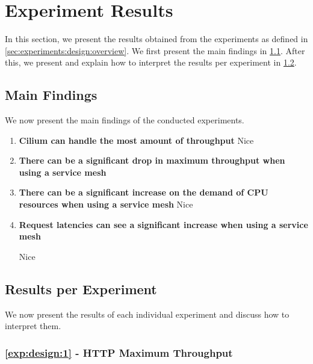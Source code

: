 \section{Experiment Results}
\label{sec:experiments:results}

In this section, we present the results obtained from the experiments as defined in \cref{sec:experiments:design:overview}. We first present the main findings in \cref{sec:experiments:main-findings}. After this, we present and explain how to interpret the results per experiment in \cref{sec:experiments:results:per-experiment}.

\subsection{Main Findings}
\label{sec:experiments:main-findings}

We now present the main findings of the conducted experiments.

\begin{enumerate}[label=\textbf{MF\arabic*}, leftmargin=3\parindent]
    \item \textbf{Cilium can handle the most amount of throughput}
    \label{exp:mf1}
    Nice
    
    \item \textbf{There can be a significant drop in maximum throughput when using a service mesh}
    \label{exp:mf2}
    
    \item \textbf{There can be a significant increase on the demand of CPU resources when using a service mesh}
    Nice
    
    \item \textbf{Request latencies can see a significant increase when using a service mesh}
    \label{exp:mf1}
    
    Nice
\end{enumerate}



\subsection{Results per Experiment}
\label{sec:experiments:results:per-experiment}

We now present the results of each individual experiment and discuss how to interpret them.

\subsubsection{\ref{exp:design:1} - HTTP Maximum Throughput}
\label{sec:experiments:results:per-experiment:01}

